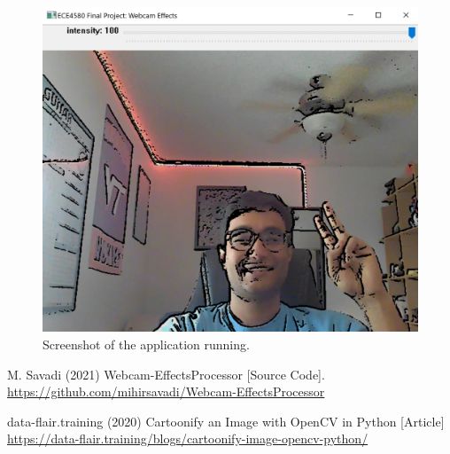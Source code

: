 \documentclass[conference]{IEEEtran}
\begin{document}
        \begin{figure}[H]
            \centering
            \captionsetup{justification=centering}
            \includegraphics[width=\linewidth]{test/gui_screenshot.jpg}
            \caption{Screenshot of the application running.}
            \label{guiscreenshot}
        \end{figure}


    \begin{thebibliography}{9}

            M. Savadi (2021) Webcam-EffectsProcessor [Source Code].
            \url{https://github.com/mihirsavadi/Webcam-EffectsProcessor}
            
            data-flair.training (2020) Cartoonify an Image with OpenCV in Python [Article]
            \url{https://data-flair.training/blogs/cartoonify-image-opencv-python/}
        
    \end{thebibliography}

    
\end{document}
